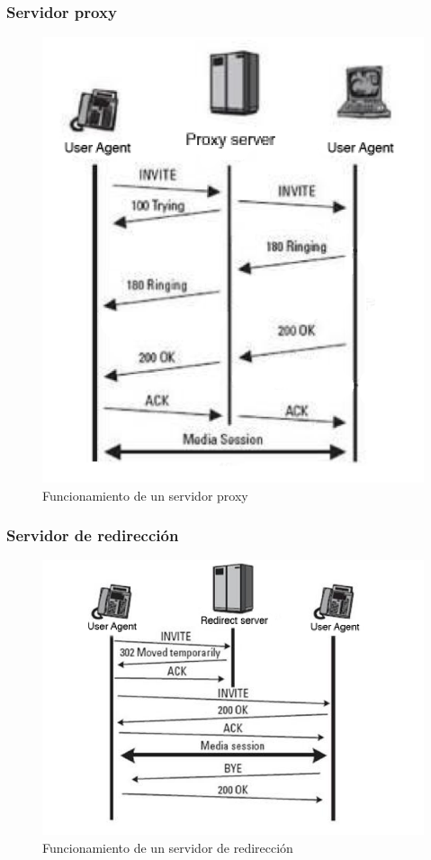 \documentclass{beamer}
\begin{document}
\begin{frame}
	\frametitle{Servidor proxy}
	\begin{figure}
		\centering
		\includegraphics[width=0.5\linewidth]{./Sproxy}\\
		Funcionamiento de un servidor proxy
		\label{fig:Sproxy}
	\end{figure}
\end{frame}

\begin{frame}
	\frametitle{Servidor de redirección}
	\begin{figure}
		\centering
		\includegraphics[width=0.7\linewidth]{./Sredirect}\\
		Funcionamiento de un servidor de redirección
		\label{fig:Sredir}
	\end{figure}
\end{frame}
\end{document}
